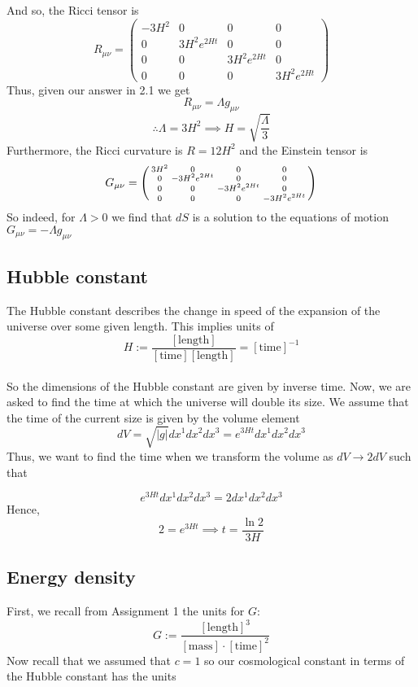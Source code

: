 \documentclass{article}
\begin{document}
		And so, the Ricci tensor is 
		$$ R_{\mu\nu} = \begin{pmatrix}
			-3H^2 & 0 & 0 & 0 \\
			0 & 3H^2e^{2Ht} & 0 & 0 \\
			0 & 0 & 3H^2e^{2Ht} & 0 \\
			0 & 0 & 0 & 3H^2e^{2Ht}
		\end{pmatrix}$$
		Thus, given our answer in 2.1 we get
		$$ R_{\mu\nu} = \Lambda g_{\mu\nu}$$
		$$\therefore \Lambda = 3H^2 \implies H = \sqrt{\frac{\Lambda}{3}}$$
		Furthermore, the Ricci curvature is $R = 12H^2$ and the Einstein tensor is
		$$ G_{\mu\nu} = \begin{psmallmatrix}
			3H^2 & 0 & 0 & 0 \\
			0 & -3H^2e^{2Ht} & 0 & 0 \\
			0 & 0 & -3H^2e^{2Ht} & 0 \\
			0 & 0 & 0 & -3H^2e^{2Ht}
		\end{psmallmatrix}$$
		So indeed, for $\Lambda > 0$ we find that $dS$ is a solution to the equations of motion $G_{\mu\nu} = -\Lambda g_{\mu\nu}$
		
		\pagebreak
		\subsection{Hubble constant}
		The Hubble constant describes the change in speed of the expansion of the universe over some given length. This implies units of
		$$ H := \frac{[\text{length}]}{[\text{time}][\text{length}]} = [\text{time}]^{-1} $$\\
		So the dimensions of the Hubble constant are given by inverse time. Now, we are asked to find the time at which the universe will double its size. We assume that the time of the current size is given by the volume element 
		$$ dV = \sqrt{|g|}dx^1 dx^2 dx^3 = e^{3Ht} dx^1 dx^2 dx^3$$
		Thus, we want to find the time when we transform the volume as $dV \to 2dV$ such that
		
		$$e^{3Ht} dx^1 dx^2 dx^3 = 2 dx^1 dx^2 dx^3 $$
		Hence,
		$$ 2 = e^{3Ht} \implies \boxed{t =  \frac{\ln2}{3H}} $$
		
		
	\pagebreak
		\subsection{Energy density}
		First, we recall from Assignment 1 the units for $G$:
		$$ G:= \frac{[\text{length}]^3}{[\text{mass}] \cdot [\text{time}]^2}$$
		Now recall that we assumed that $c=1$ so our cosmological constant in terms of the Hubble constant has the units
		
\end{document}
